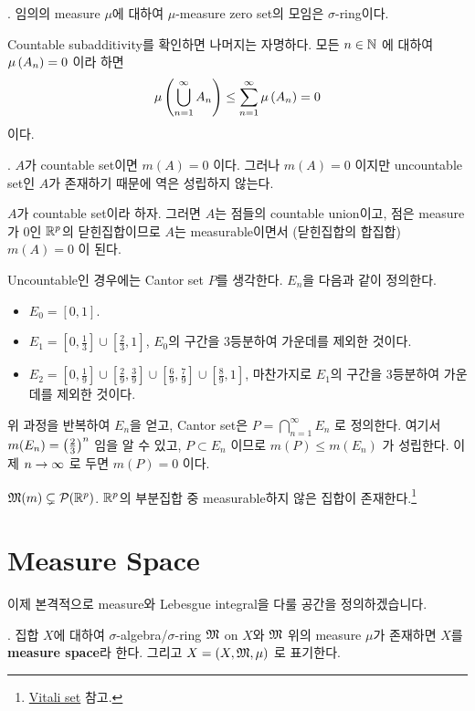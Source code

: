\prop. 임의의 measure \(\mu\)에 대하여 \(\mu\)-measure zero set의 모임은 \(\sigma\)-ring이다.

\pf Countable subadditivity를 확인하면 나머지는 자명하다. 모든 \(n\in \mathbb{N}\) 에 대하여 \(\mu\left( A_n \right) = 0\) 이라 하면
\[
    \mu\left( \bigcup_{n=1}^{\infty} A_n \right) \leq \sum_{n=1}^{\infty} \mu\left( A_n \right) = 0
\]
이다.

\prop. \(A\)가 countable set이면 \(m(A) = 0\) 이다. 그러나 \(m(A) = 0\) 이지만 uncountable set인 \(A\)가 존재하기 때문에 역은 성립하지 않는다.

\pf \(A\)가 countable set이라 하자. 그러면 \(A\)는 점들의 countable union이고, 점은 measure가 0인 \(\mathbb{R}^p\)의 닫힌집합이므로 \(A\)는 measurable이면서 (닫힌집합의 합집합) \(m(A) = 0\) 이 된다.

Uncountable인 경우에는 Cantor set \(P\)를 생각한다. \(E_n\)을 다음과 같이 정의한다.
\begin{itemize}
    \item \(E_0 = [0, 1]\).
    \item \(E_1 = \left[0, \frac{1}{3}\right] \cup \left[\frac{2}{3}, 1\right]\), \(E_0\)의 구간을 3등분하여 가운데를 제외한 것이다.
    \item \(E_2 = \left[0, \frac{1}{9}\right] \cup \left[\frac{2}{9}, \frac{3}{9}\right] \cup \left[\frac{6}{9}, \frac{7}{9}\right] \cup \left[\frac{8}{9}, 1\right]\), 마찬가지로 \(E_1\)의 구간을 3등분하여 가운데를 제외한 것이다.
\end{itemize}
위 과정을 반복하여 \(E_n\)을 얻고, Cantor set은 \(P = \bigcap_{n=1}^{\infty} E_n\) 로 정의한다. 여기서 \(m(E_n) = \left( \frac{2}{3} \right)^n\) 임을 알 수 있고, \(P \subset E_n\) 이므로 \(m(P)\leq m(E_n)\) 가 성립한다. 이제 \(n \rightarrow \infty\) 로 두면 \(m(P) = 0\) 이다.

\rmk \(\mathfrak{M}(m) \subsetneq \mathcal{P}(\mathbb{R}^p)\). \(\mathbb{R}^p\)의 부분집합 중 measurable하지 않은 집합이 존재한다.\footnote{\href{https://en.wikipedia.org/wiki/Vitali_set}{Vitali set} 참고.}

\section*{Measure Space}

이제 본격적으로 measure와 Lebesgue integral을 다룰 공간을 정의하겠습니다.

.  집합 \(X\)에 대하여 \(\sigma\)-algebra/\(\sigma\)-ring \(\mathfrak{M}\) on \(X\)와 \(\mathfrak{M}\) 위의 measure \(\mu\)가 존재하면 \(X\)를 \textbf{measure space}라 한다. 그리고 \(X = (X, \mathfrak{M}, \mu)\) 로 표기한다.


